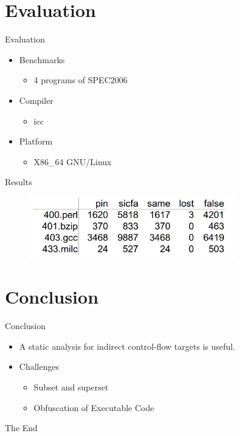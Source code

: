 \documentclass{beamer}
\begin{document}
\section{Evaluation}
\begin{frame}{Evaluation}
    \begin{itemize}
        \item Benchmarks
            \begin{itemize}
                \item 4 programs of SPEC2006
            \end{itemize}
        \item Compiler
            \begin{itemize}
                \item icc
            \end{itemize}
        \item Platform
            \begin{itemize}
                \item X86\_64 GNU/Linux
            \end{itemize}
    \end{itemize}
\end{frame}

\begin{frame}{Results}
    \begin{figure}[htbp]
        \centering\includegraphics[width=0.8\textwidth]{results.png}
    \end{figure}
\end{frame}

\section{Conclusion}
\begin{frame}{Conclusion}
    \begin{itemize}
        \item
            A static analysis for indirect control-flow targets is useful.
            \pause
        \item Challenges
            \begin{itemize}
                \item Subset and superset \pause
                \item Obfuscation of Executable Code
            \end{itemize}

    \end{itemize}
\end{frame}

\begin{frame}
    \Huge{\centerline{The End}}
\end{frame}
\end{document}
